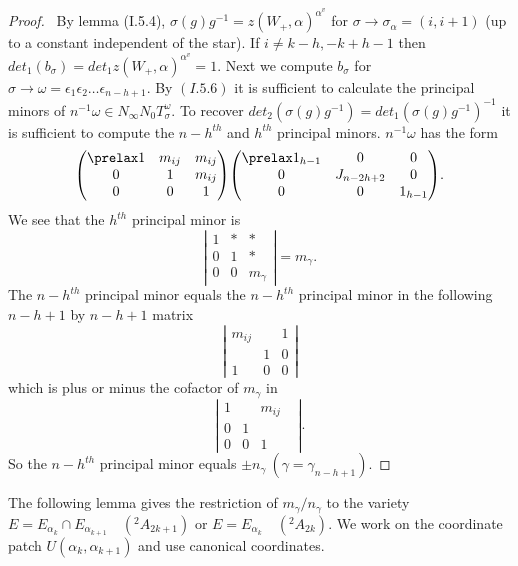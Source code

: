 \documentclass{memo-l}
\theoremstyle{definition}
\theoremstyle{remark}
\numberwithin{section}{chapter}
\numberwithin{equation}{chapter}
\begin{document}
\begin{proof} \ By lemma (I.5.4), ${\sigma}(g)g^{-1}  =
z(W_{+},{\alpha})^{{\alpha}^{v}}$ for ${\sigma} {\to}
{\sigma}_{{\alpha}}  =  (i,i+1)$ (up to a constant independent of the star).
If $i \ne  k-h, -k+h-1$ then $det_{1}(b_{{\sigma}})  =
det_{1}z(W_{+},{\alpha})^{{\alpha}^{v}} = 1$.  Next we compute
$b_{{\sigma}}$ for ${\sigma} {\to} {\omega}  =
{\epsilon}_{1}{\epsilon}_{2}\ldots {\epsilon}_{n-h+1}$.  By $(I.5.6)$ it is
sufficient to calculate the principal minors of $n^{-1}{\omega}  \in
N_{{\infty}}N_{0}T_{{\sigma}}^{\omega}.$ To recover
$det_{2}({\sigma}(g)g^{-1})  =  det_{1}({\sigma}(g)g^{-1})^{-1}$ it is
sufficient to compute the $n-h^{th}$ and $h^{th}$ principal minors.
$n^{-1}{\omega}$ has the form
$$
{\begin{pmatrix} \prelax  1 & m_{ij} & m_{ij} \\ 0 & 1 & m_{ij} \\ 0 & 0 & 1 \end{pmatrix}}
{\begin{pmatrix} \prelax   1_{h-1} & 0 & 0 \\ 0 & J_{n-2h+2} & 0 \\ 0 & 0 & 1_{h-1} \end{pmatrix}} .
$$
We see that the $h^{th}$ principal minor is
$$
\left\vert
\begin{matrix} 1 & * & * \\ 0 & 1 & * \\ 0 & 0 & m_\gamma
\end{matrix}
\right\vert
= m_\gamma.
$$
The $n-h^{th}$ principal minor equals the $n-h^{th}$ principal minor in the
following $n-h+1$ by $n-h+1$ matrix
$$
\left\vert
\begin{matrix}
m_{ij} & & 1 \\ & 1 & 0 \\ 1 & 0 & 0
\end{matrix}
\right\vert
$$
which is plus or minus the cofactor of $m_{{\gamma}}$ in
$$
\left\vert
\begin{matrix} 1 && m_{ij} \\ 0 & 1 && \\ 0 & 0 & 1 \end{matrix}
\right\vert.
$$
So the $n-h^{th}$ principal minor equals ${\pm}n_{{\gamma}}\  ({\gamma}
 = {\gamma}_{n-h+1})$.
\end{proof}

{\medskip}

The following lemma gives the restriction of
$m_{{\gamma}}/n_{{\gamma}}$ to the variety $E  =  E_{{\alpha_k}} {\cap}
E_{{\alpha_{k+1}}}$\ \  $(^{2}A_{2k+1})$ or $E  =  E_{{\alpha_k}}$\ \
$(^{2}A_{2k})$.
We work on the coordinate patch $U({\alpha}_{k},{\alpha}_{k+1})$ and use
canonical coordinates.
\end{document}
